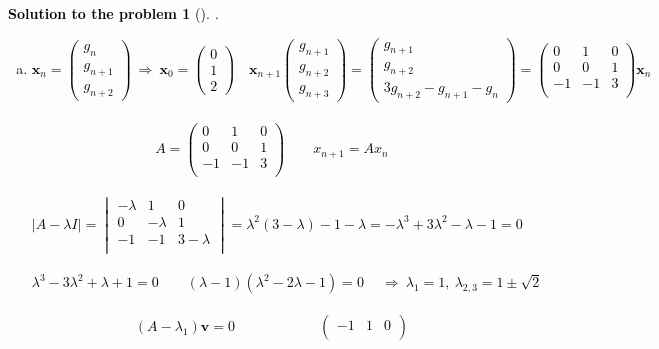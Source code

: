 \documentclass[12pt,a4]{article}
\newtheorem{solution}{Solution to the problem}
\newcommand{\bv}{{\mathbf v}}
\newcommand{\bx}{{\mathbf x}}
\begin{document}
\textcolor{black}{
\begin{solution}[]\rm .
\begin{enumerate}[(a)]
	\item
\[
\bx_n =
\begin{pmatrix}
g_n \\ g_{n+1} \\ g_{n+2}
\end{pmatrix}
~ \Rightarrow ~
\bx_0 = 
\begin{pmatrix}
0 \\ 1 \\ 2
\end{pmatrix}
\quad
\bx_{n+1}
\begin{pmatrix}
g_{n+1} \\ g_{n+2} \\ g_{n+3}
\end{pmatrix}
=
\begin{pmatrix}
g_{n+1} \\ g_{n+2} \\ 3g_{n+2} - g_{n+1} - g_n
\end{pmatrix}
=
\begin{pmatrix}
0 & 1 & 0 \\
0 & 0 & 1 \\
-1 & -1 & 3 \\
\end{pmatrix}
\bx_n
\]\\[5pt]
\[
A =
\begin{pmatrix}
0 & 1 & 0 \\
0 & 0 & 1 \\
-1 & -1 & 3 \\
\end{pmatrix}
\qquad
x_{n+1} = Ax_{n}
\]\\[5pt]
\[
\left | A - \lambda I \right | = 
\begin{vmatrix}
-\lambda & 1 & 0 \\
0 & -\lambda & 1 \\
-1 & -1 & 3-\lambda \\
\end{vmatrix}
=
\lambda^2(3-\lambda) - 1 - \lambda
=
-\lambda^3 + 3\lambda^2 - \lambda - 1 = 0
\]\\[5pt]
\[
\lambda^3 - 3\lambda^2 + \lambda + 1 = 0
\qquad
(\lambda - 1)(\lambda^2 - 2\lambda - 1) = 0
\quad
~\Rightarrow~
\lambda_1 = 1, ~
\lambda_{2,3} = 1 \pm \sqrt2
\]\\[5pt]
\[
(A-\lambda_1)\bv = 0
\qquad\qquad\qquad
\begin{pmatrix}
-1 & 1 & 0 \\

\end{pmatrix}\]
\end{enumerate}
\end{solution}}
\end{document}

